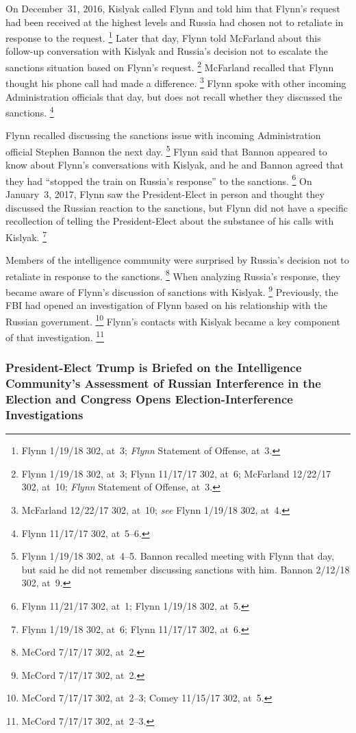 On December~31, 2016, Kislyak called Flynn and told him that Flynn's request had been received at the highest levels and Russia had chosen not to retaliate in response to the request.%
\footnote{Flynn 1/19/18 302, at~3;
\textit{Flynn} Statement of Offense, at~3.}
Later that day, Flynn told McFarland about this follow-up conversation with Kislyak and Russia's decision not to escalate the sanctions situation based on Flynn's request.%
\footnote{Flynn 1/19/18 302, at~3;
Flynn 11/17/17 302, at~6;
McFarland 12/22/17 302, at~10;
\textit{Flynn} Statement of Offense, at~3.}
McFarland recalled that Flynn thought his phone call had made a difference.%
\footnote{McFarland 12/22/17 302, at~10;
\textit{see} Flynn 1/19/18 302, at~4.}
Flynn spoke with other incoming Administration officials that day, but does not recall whether they discussed the sanctions.%
\footnote{Flynn 11/17/17 302, at~5--6.}

Flynn recalled discussing the sanctions issue with incoming Administration official Stephen Bannon the next day.%
\footnote{Flynn 1/19/18 302, at~4--5.
Bannon recalled meeting with Flynn that day, but said he did not remember discussing sanctions with him.
Bannon 2/12/18 302, at~9.}
Flynn said that Bannon appeared to know about Flynn's conversations with Kislyak, and he and Bannon agreed that they had ``stopped the train on Russia's response'' to the sanctions.%
\footnote{Flynn 11/21/17 302, at~1;
Flynn 1/19/18 302, at~5.}
On January~3, 2017, Flynn saw the President-Elect in person and thought they discussed the Russian reaction to the sanctions, but Flynn did not have a specific recollection of telling the President-Elect about the substance of his calls with Kislyak.%
\footnote{Flynn 1/19/18 302, at~6;
Flynn 11/17/17 302, at~6.}

Members of the intelligence community were surprised by Russia's decision not to retaliate in response to the sanctions.%
\footnote{McCord 7/17/17 302, at~2.}
When analyzing Russia's response, they became aware of Flynn's discussion of sanctions with Kislyak.%
\footnote{McCord 7/17/17 302, at~2.}
Previously, the FBI had opened an investigation of Flynn based on his relationship with the Russian government.%
\footnote{McCord 7/17/17 302, at~2--3;
Comey 11/15/17 302, at~5.}
Flynn's contacts with Kislyak became a key component of that investigation.%
\footnote{McCord 7/17/17 302, at~2--3.}

\subsubsection{President-Elect Trump is Briefed on the Intelligence Community's Assessment of Russian Interference in the Election and Congress Opens Election-Interference Investigations}

